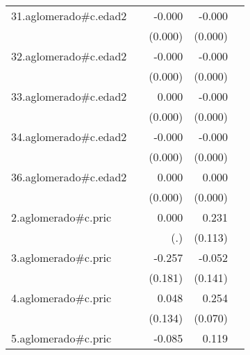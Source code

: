 {\begin{longtable}{l*{4}{D{.}{.}{-1}}}
\addlinespace
31.aglomerado#c.edad2&                     &      -0.000\sym{*}  &      -0.000\sym{***}&                     \\
            &                     &     (0.000)         &     (0.000)         &                     \\
\addlinespace
32.aglomerado#c.edad2&                     &      -0.000         &      -0.000\sym{***}&                     \\
            &                     &     (0.000)         &     (0.000)         &                     \\
\addlinespace
33.aglomerado#c.edad2&                     &       0.000         &      -0.000\sym{***}&                     \\
            &                     &     (0.000)         &     (0.000)         &                     \\
\addlinespace
34.aglomerado#c.edad2&                     &      -0.000         &      -0.000\sym{*}  &                     \\
            &                     &     (0.000)         &     (0.000)         &                     \\
\addlinespace
36.aglomerado#c.edad2&                     &       0.000         &       0.000         &                     \\
            &                     &     (0.000)         &     (0.000)         &                     \\
\addlinespace
2.aglomerado#c.pric&                     &       0.000         &       0.231\sym{*}  &                     \\
            &                     &         (.)         &     (0.113)         &                     \\
\addlinespace
3.aglomerado#c.pric&                     &      -0.257         &      -0.052         &                     \\
            &                     &     (0.181)         &     (0.141)         &                     \\
\addlinespace
4.aglomerado#c.pric&                     &       0.048         &       0.254\sym{***}&                     \\
            &                     &     (0.134)         &     (0.070)         &                     \\
\addlinespace
5.aglomerado#c.pric&                     &      -0.085         &       0.119         &                     \\

\end{longtable}}
